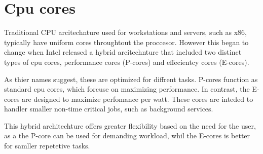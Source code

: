 \section{Cpu cores}
Traditional CPU arcitechnture used for workstations and servers, such as x86, typically have uniform cores throughtout the proccesor. However this began to change when Intel released a hybrid arcitechnture that included two distinct types of cpu cores, performance cores (P-cores) and effecientcy cores (E-cores).

As thier names suggest, these are optimized for diffrent tasks. P-cores function as standard cpu cores, which forcuse on maximizing performance. In contrast, the E-cores are designed to maximize perfomance per watt. These cores are inteded to handler smaller non-time critical jobs, such as background services\cite{rotem2022intel}.

This hybrid architechture offers greater flexibility based on the need for the user, as a the P-core can be used for demanding workload, whil the E-cores is better for samller repetetive tasks.
